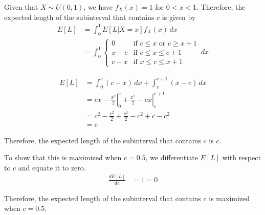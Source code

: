 Given that \( X \sim U(0, 1) \), we have \( f_X(x) = 1 \) for \( 0 < x < 1 \).
Therefore, the expected length of the subinterval that contains \( c \) is given by
\begin{align*}
    E[L] & = \int_{0}^{1} E[L|X=x] f_X(x) \, dx                            \\
         & = \int_{0}^{1} \begin{cases}
                              0   & \text{if } c \leq x \text{ or } c \geq x+1 \\
                              x-c & \text{if } c \leq x \leq c+1               \\
                              c-x & \text{if } x \leq c \leq x+1
                          \end{cases} \, dx
\end{align*}

\begin{align*}
    E[L] & = \int_{0}^{c} (c-x) \, dx + \int_{c}^{c+1} (x-c) \, dx                                   \\
         & = \left. cx - \frac{x^2}{2} \right|_{0}^{c} + \left. \frac{x^2}{2} - cx \right|_{c}^{c+1} \\
         & = c^2 - \frac{c^2}{2} + \frac{c^2}{2} - c^2 + c - c^2                                     \\
         & = c
\end{align*}

Therefore, the expected length of the subinterval that contains \( c \) is \( c \).

To show that this is maximized when \( c=0.5 \), we differentiate \( E[L] \) with respect to \( c \) and equate it to zero.
\begin{align*}
    \frac{dE[L]}{dc} & = 1 = 0
\end{align*}

Therefore, the expected length of the subinterval that contains \( c \) is maximized when \( c=0.5 \).
